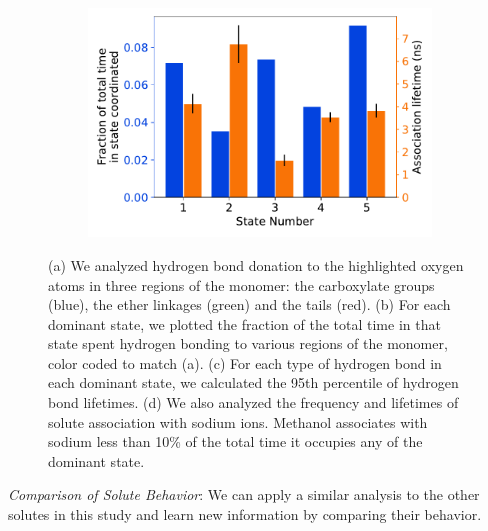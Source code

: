\documentclass[journal=jpcbfk,manuscript=article]{achemso}
\begin{document}
\begin{figure}
\begin{subfigure}{0.475\textwidth}
  \caption{}\label{fig:hbond_lifetimes}
  \end{subfigure}
  \begin{subfigure}{0.475\textwidth}
  \includegraphics[width=\textwidth]{association_fraction_lifetimes.pdf}
  \caption{}\label{fig:association_fraction_lifetimes}
  \end{subfigure}
  \caption{(a) We analyzed hydrogen bond donation to the highlighted oxygen atoms in three 
  regions of the monomer: the carboxylate groups (blue), the ether linkages (green) and the
  tails (red). (b) For each dominant state, we plotted the fraction of the total time in
  that state spent hydrogen bonding to various regions of the monomer, color coded to match (a).
  (c) For each type of hydrogen bond in each dominant state, we calculated the 95th percentile
  of hydrogen bond lifetimes. (d) We also analyzed the frequency and lifetimes of solute 
  association with sodium ions. Methanol associates with sodium less than 10\% of the total 
  time it occupies any of the dominant state.
  }
  \label{fig:hydrogen_bonding}
  \end{figure}
  
  \textit{Comparison of Solute Behavior}: We can apply a similar analysis to the other 
  solutes in this study and learn new information by comparing their behavior. 
 
\end{document}

